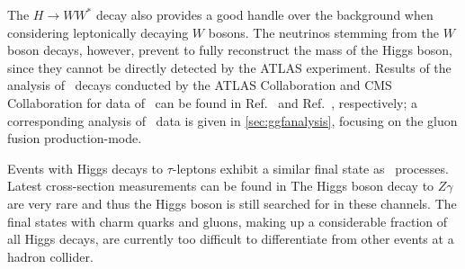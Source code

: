 The $H \rightarrow WW^*$ decay also provides a good handle over the background when considering leptonically decaying $W$ bosons.
The neutrinos stemming from the $W$ boson decays, however, prevent to fully reconstruct the mass of the Higgs boson, since they cannot be directly detected by the ATLAS experiment.
Results of the analysis of \HWW\ decays conducted by the ATLAS Collaboration and CMS Collaboration for data of \RunOne\ can be found in Ref.~\cite{PhysRevD.92.012006} and Ref.~\cite{2013arXiv1312.1129C}, respectively; a corresponding analysis of \RunTwo\ data is given in \cref{sec:ggfanalysis}, focusing on the gluon fusion production-mode.

Events with Higgs decays to $\tau$-leptons exhibit a similar final state as \HWW\ processes.
Latest cross-section measurements can be found in 
The Higgs boson decay to $Z\gamma$ are very rare and thus the Higgs boson is still searched for in these channels. 
The final states with charm quarks and gluons, making up a considerable fraction of all Higgs decays, are currently too difficult to differentiate from other events at a hadron collider.






